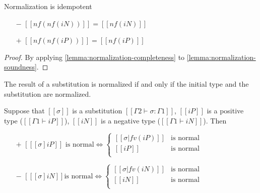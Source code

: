 \begin{lemma}
  \label{lemma:norm-idemp}
  Normalization is idempotent
  \begin{itemize}
  \item[$-$] $[[nf(nf(iN))]] = [[nf(iN)]]$
  \item[$+$] $[[nf(nf(iP))]] = [[nf(iP)]]$
  \end{itemize}
\end{lemma}
\begin{proof}
  By applying \cref{lemma:normalization-completeness} to \cref{lemma:normalization-soundness}.
\end{proof}


\begin{lemma}
  \label{lemma:normal-after-subst}
  The result of a substitution is normalized if and only if the initial type and
  the substitution are normalized.

  Suppose that $[[σ]]$ is a substitution  $[[Γ2 ⊢ σ : Γ1]]$,
  $[[iP]]$ is a positive type ($[[Γ1 ⊢ iP]]$),
  $[[iN]]$ is a negative type ($[[Γ1 ⊢ iN]]$). Then
  \begin{itemize}
  \item[$+$]
    $[[ [σ]iP  ]] \text{ is normal} \iff
    \begin{cases}
      [[σ|fv(iP)]] &\text{is normal}\\
      [[iP]]       &\text{is normal}\\
    \end{cases} $
  \item[$-$]
    $[[ [σ]iN  ]] \text{is normal} \iff
    \begin{cases}
      [[σ|fv(iN)]] &\text{is normal}\\
      [[iN]]       &\text{is normal}\\
    \end{cases} $
  \end{itemize}
\end{lemma}
